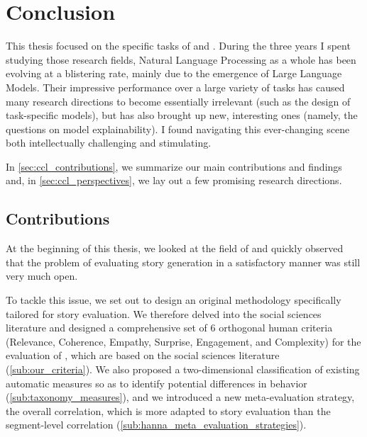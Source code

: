 \chapter{Conclusion}
\label{chap:conclusion}
\minitoc
\newpage


This thesis focused on the specific tasks of {\asgfull} and {\asefull}. During the three years I spent studying those research fields, Natural Language Processing as a whole has been evolving at a blistering rate, mainly due to the emergence of Large Language Models. Their impressive performance over a large variety of tasks has caused many research directions to become essentially irrelevant (such as the design of task-specific models), but has also brought up new, interesting ones (namely, the questions on model explainability). I found navigating this ever-changing scene both intellectually challenging and stimulating.

In \autoref{sec:ccl_contributions}, we summarize our main contributions and findings and, in \autoref{sec:ccl_perspectives}, we lay out a few promising research directions.

\section{Contributions}
\label{sec:ccl_contributions}

At the beginning of this thesis, we looked at the field of {\asgfull} and quickly observed that the problem of evaluating story generation in a satisfactory manner was still very much open.

To tackle this issue, we set out to design an original methodology specifically tailored for story evaluation. We therefore delved into the social sciences literature and designed a comprehensive set of 6 orthogonal human criteria (Relevance, Coherence, Empathy, Surprise, Engagement, and Complexity) for the evaluation of \asg, which are based on the social sciences literature (\autoref{sub:our_criteria}). We also proposed a two-dimensional classification of existing automatic measures so as to identify potential differences in behavior (\autoref{sub:taxonomy_measures}), and we introduced a new meta-evaluation strategy, the overall correlation, which is more adapted to story evaluation than the segment-level correlation (\autoref{sub:hanna_meta_evaluation_strategies}).


